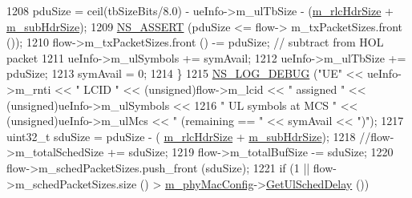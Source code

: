 \begin{DoxyCode}
1208                                                         pduSize = ceil(tbSizeBits/8.0) - ueInfo->m\_ulTbSize
       - (\hyperlink{classns3_1_1MmWaveFlexTtiMaxWeightMacScheduler_a12646efe5a10dfd27c8839b224b2ed53}{m\_rlcHdrSize} + \hyperlink{classns3_1_1MmWaveFlexTtiMaxWeightMacScheduler_a0f66f1575529b6532871202961e92c86}{m\_subHdrSize});
1209                                                         \hyperlink{assert_8h_a6dccdb0de9b252f60088ce281c49d052}{NS\_ASSERT} (pduSize <= flow->
      m\_txPacketSizes.front ());
1210                                                         flow->m\_txPacketSizes.front () -= pduSize;              \textcolor{comment}{
      // subtract from HOL packet}
1211                                                         ueInfo->m\_ulSymbols += symAvail;
1212                                                         ueInfo->m\_ulTbSize += pduSize;
1213                                                         symAvail = 0;
1214                                                 \}
1215                                                 \hyperlink{group__logging_ga413f1886406d49f59a6a0a89b77b4d0a}{NS\_LOG\_DEBUG} (\textcolor{stringliteral}{"UE"} << ueInfo->m\_rnti << \textcolor{stringliteral}{" LCID 
      "} << (\textcolor{keywordtype}{unsigned})flow->m\_lcid << \textcolor{stringliteral}{" assigned "} << (\textcolor{keywordtype}{unsigned})ueInfo->m\_ulSymbols <<
1216                                                                                                            
         \textcolor{stringliteral}{" UL symbols at MCS "} << (\textcolor{keywordtype}{unsigned})ueInfo->m\_ulMcs << \textcolor{stringliteral}{" (remaining == "} << symAvail << \textcolor{stringliteral}{")"});
1217                                                 uint32\_t sduSize = pduSize - (
      \hyperlink{classns3_1_1MmWaveFlexTtiMaxWeightMacScheduler_a12646efe5a10dfd27c8839b224b2ed53}{m\_rlcHdrSize} + \hyperlink{classns3_1_1MmWaveFlexTtiMaxWeightMacScheduler_a0f66f1575529b6532871202961e92c86}{m\_subHdrSize});
1218                                                 \textcolor{comment}{//flow->m\_totalSchedSize += sduSize;}
1219                                                 flow->m\_totalBufSize -= sduSize;
1220                                                 flow->m\_schedPacketSizes.push\_front (sduSize);
1221                                                 \textcolor{keywordflow}{if} (1 || flow->m\_schedPacketSizes.size () > 
      \hyperlink{classns3_1_1MmWaveMacScheduler_a24d7af4971d2e500fe543cefbafa2fd9}{m\_phyMacConfig}->\hyperlink{classns3_1_1MmWavePhyMacCommon_afd70935ec71838fefe6a8e18198f19cb}{GetUlSchedDelay} ())

\end{DoxyCode}
